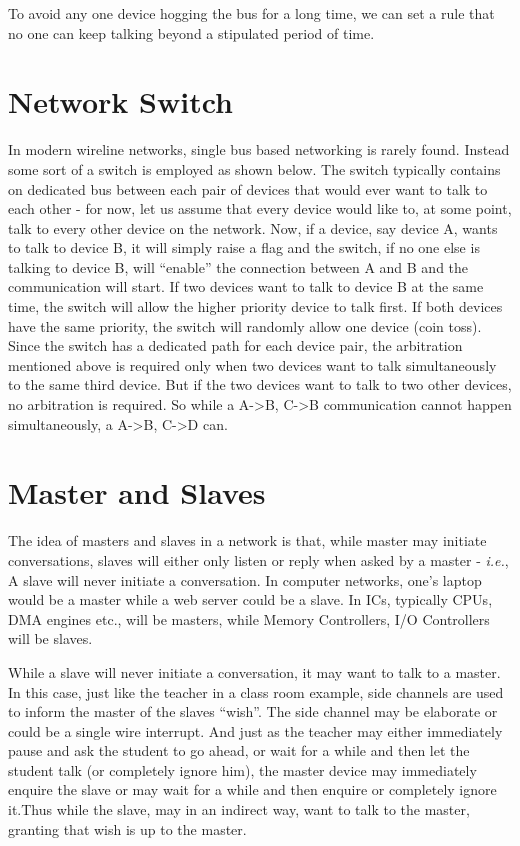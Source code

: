 To avoid any one device hogging the bus for a long time, we can set a rule that no one can keep talking beyond a stipulated period of time.

\section{Network Switch}
In modern wireline networks, single bus based networking is rarely found. Instead some sort of a switch is employed as shown below. The switch typically contains on dedicated bus between each pair of devices that would ever want to talk to each other - for now, let us assume that every device would like to, at some point, talk to every other device on the network. Now, if a device, say device A, wants to talk to device B, it will simply raise a flag and the switch, if no one else is talking to device B, will ``enable'' the connection between A and B and the communication will start. If two devices want to talk to device B at the same time, the switch will allow the higher priority device to talk first. If both devices have the same priority, the switch will randomly allow one device (coin toss). Since the switch has a dedicated path for each device pair, the arbitration mentioned above is required only when two devices want to talk simultaneously to the same third device. But if the two devices want to talk to two other devices, no arbitration is required. So while a A->B, C->B communication cannot happen simultaneously, a A->B, C->D can.

\section{Master and Slaves}
The idea of masters and slaves in a network is that, while master may initiate conversations, slaves will either only listen or reply when asked by a master - \emph{i.e.}, A slave will never initiate a conversation. In computer networks, one's laptop would be a master while a web server could be a slave. In ICs, typically CPUs, DMA engines etc., will be masters, while Memory Controllers, I/O Controllers will be slaves.

While a slave will never initiate a conversation, it may want to talk to a master. In this case, just like the teacher in a class room example, side channels are used to inform the master of the slaves ``wish''. The side channel may be elaborate or could be a single wire interrupt. And just as the teacher may either immediately pause and ask the student to go ahead, or wait for a while and then let the student talk (or completely ignore him), the master device may immediately enquire the slave or may wait for a while and then enquire or completely ignore it.Thus while the slave, may in an indirect way, want to talk to the master, granting that wish is up to the master. 


